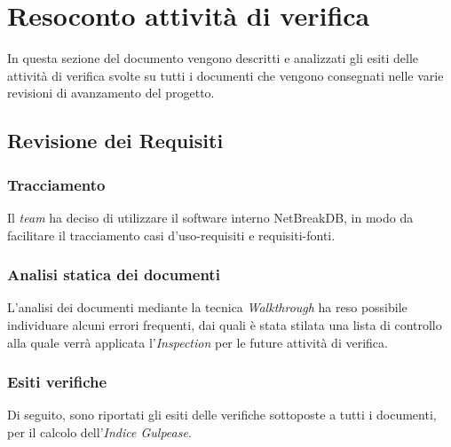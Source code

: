 \newpage
\section{Resoconto attività di verifica}
In questa sezione del documento vengono descritti e analizzati gli esiti delle attività di verifica svolte su tutti i documenti che vengono consegnati nelle varie revisioni di avanzamento del progetto.
	
	\subsection{Revisione dei Requisiti}
			
		\subsubsection{Tracciamento}
		Il \textit{team} ha deciso di utilizzare il software interno NetBreakDB, in modo da facilitare il tracciamento casi d’uso-requisiti e requisiti-fonti.
			
		\subsubsection{Analisi statica dei documenti}
		L’analisi dei documenti mediante la tecnica \textit{Walkthrough} ha reso possibile individuare alcuni errori frequenti, dai quali è stata stilata una lista di controllo alla quale verrà applicata l’\textit{Inspection} per le future attività di verifica.
			
		\subsubsection{Esiti verifiche}
		Di seguito, sono riportati gli esiti delle verifiche sottoposte a tutti i documenti, per il calcolo dell’\textit{Indice Gulpease}.
	
